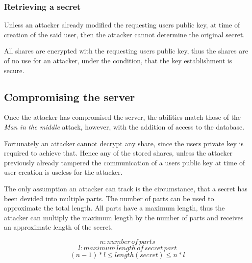 \subsubsection{Retrieving a secret}

Unless an attacker already modified the requesting users public key, at time of
creation of the said user, then the attacker cannot determine the original
secret.

All shares are encrypted with the requesting users public key, thus the shares
are of no use for an attacker, under the condition, that the key establishment
is secure.

\subsection{Compromising the server}

Once the attacker has compromised the server, the abilities match those of the
\textit{Man in the middle} attack, however, with the addition of access to the
database.

Fortunately an attacker cannot decrypt any share, since the users private key
is required to achieve that. Hence any of the stored shares, unless the
attacker previously already tampered the communication of a users public key at
time of user creation is useless for the attacker.

The only assumption an attacker can track is the circumstance, that a secret
has been devided into multiple parts. The number of parts can be used to
approximate the total length. All parts have a maximum length, thus the
attacker can multiply the maximum length by the number of parts and receives an
approximate length of the secret.

$$n: number\,of\,parts$$
$$l: maximum\,length\,of\,secret\,part$$
$$(n - 1) * l \leq length(secret) \leq n * l$$

